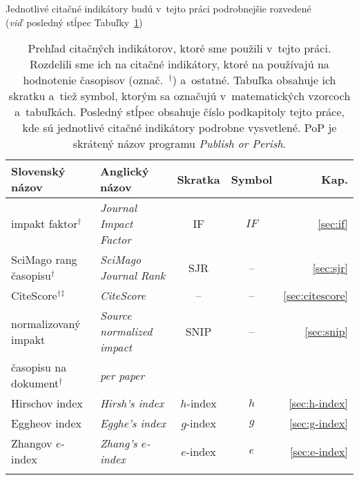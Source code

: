 Jednotlivé citačné indikátory budú v~tejto práci podrobnejšie rozvedené
(\emph{viď}~posledný stĺpec Tabuľky~\ref{tab:indicators.review})

\begin{table}
  \caption[Prehľad citačných indikátorov]%
  {Prehľad citačných indikátorov, ktoré sme použili v~tejto práci.  Rozdelili
    sme ich na citačné indikátory, ktoré na používajú na hodnotenie časopisov
    (označ.~$^\dagger$) a~ostatné.  Tabuľka obsahuje ich skratku a~tiež symbol,
    ktorým sa označujú v~matematických vzorcoch a~tabuľkách.  Posledný stĺpec
     obsahuje číslo podkapitoly tejto práce, kde sú jednotlivé citačné
    indikátory podrobne vysvetlené.  PoP je skrátený názov programu
    \emph{Publish or Perish}.}
  \label{tab:indicators.review}
  \centering\small
  \begin{tabularx}{\textwidth}{llccr}
    \toprule
    Slovenský názov & Anglický názov & Skratka & Symbol & Kap. \\
    \midrule
    impakt faktor$^\dagger$         & \emph{Journal Impact Factor}           & IF                     & $\mathit{IF}$         & \ref{sec:if}        \\[0.5ex]
    SciMago rang časopisu$^\dagger$ & \emph{SciMago Journal Rank}            & SJR                    & --                    & \ref{sec:sjr}       \\[0.5ex]
    CiteScore$^\dagger$$^\ddagger$  & \emph{CiteScore}                       & --                     & --                    & \ref{sec:citescore} \\[0.5ex]
    normalizovaný impakt            & \emph{Source normalized impact}        & SNIP                   & --                    & \ref{sec:snip}      \\[-0.25ex]
    časopisu na dokument$^\dagger$  & \emph{per paper}                       &                        &                       &                     \\[0.5ex]
    Hirschov index                  & \emph{Hirsh's index}                   & $h$-index              & $h$                   & \ref{sec:h-index}   \\[1.5ex]
    Eggheov index                   & \emph{Egghe's index}                   & $g$-index              & $g$                   & \ref{sec:g-index}   \\[0.5ex]
    Zhangov $e$-index               & \emph{Zhang's $e$-index}               & $e$-index              & $e$                   & \ref{sec:e-index}   \\[0.5ex]
$$
\end{tabularx}
\end{table}
